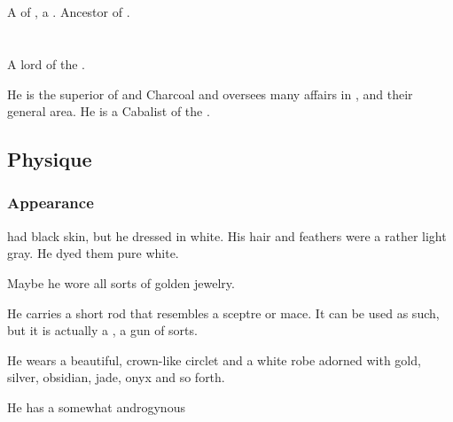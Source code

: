 \section{\Shehizol}
\index{\Shehizol}
A \resvil{} of \CiriathSepher, a \sathariah. 
Ancestor of . 















\section{\Teshrial}
\index{\Teshrial}
A \resphan{} lord of the \CiriathSepher. 

He is the superior of \Achsah{} and Charcoal and oversees many affairs in \Malcur, \Scyrum{} and their general area. He is a Cabalist of the . 








\subsection{Physique}





\subsubsection{Appearance}
\Teshrial{} had black skin, but he dressed in white.
His hair and feathers were a rather light gray.
He dyed them pure white. 

Maybe he wore all sorts of golden jewelry. 

He carries a short rod that resembles a sceptre or mace. It can be used as such, but it is actually a , a gun of sorts. 

He wears a beautiful, crown-like circlet and a white robe adorned with gold, silver, obsidian, jade, onyx and so forth. 

He has a somewhat androgynous 

